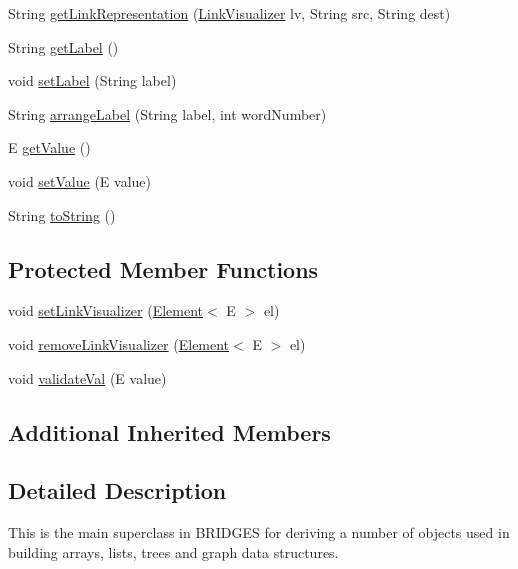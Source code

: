 \begin{DoxyCompactItemize}
\item 
String \hyperlink{classbridges_1_1base_1_1_element_ae32deb37d1ad95d2fdfaa616062f319d}{get\+Link\+Representation} (\hyperlink{classbridges_1_1base_1_1_link_visualizer}{Link\+Visualizer} lv, String src, String dest)
\item 
String \hyperlink{classbridges_1_1base_1_1_element_a5c831a0238de487765f6021a887f1542}{get\+Label} ()
\item 
void \hyperlink{classbridges_1_1base_1_1_element_a942ccd766aeca0c4fdbe27ef8cbe78d9}{set\+Label} (String label)
\item 
String \hyperlink{classbridges_1_1base_1_1_element_acd2191242df8a7bf2e8b6ced87880ba6}{arrange\+Label} (String label, int word\+Number)
\item 
E \hyperlink{classbridges_1_1base_1_1_element_a44ddc61db34b6cf0bab7dfba667d54af}{get\+Value} ()
\item 
void \hyperlink{classbridges_1_1base_1_1_element_ab3cf1241da0bc4c59cea9d6f0fd7aaf4}{set\+Value} (E value)
\item 
String \hyperlink{classbridges_1_1base_1_1_element_a7dc685e317fd9dc2e73e049a9f907e42}{to\+String} ()
\end{DoxyCompactItemize}
\subsection*{Protected Member Functions}
\begin{DoxyCompactItemize}
\item 
void \hyperlink{classbridges_1_1base_1_1_element_af6251f52b9d277dd77e3bab1829d0197}{set\+Link\+Visualizer} (\hyperlink{classbridges_1_1base_1_1_element}{Element}$<$ E $>$ el)
\item 
void \hyperlink{classbridges_1_1base_1_1_element_a144cd54e043a801fab326769a5da01e2}{remove\+Link\+Visualizer} (\hyperlink{classbridges_1_1base_1_1_element}{Element}$<$ E $>$ el)
\item 
void \hyperlink{classbridges_1_1base_1_1_element_af1a60f4e6a91d379179f7d56e6dc3829}{validate\+Val} (E value)
\end{DoxyCompactItemize}
\subsection*{Additional Inherited Members}


\subsection{Detailed Description}
This is the main superclass in B\+R\+I\+D\+G\+E\+S for deriving a number of objects used in building arrays, lists, trees and graph data structures. 

